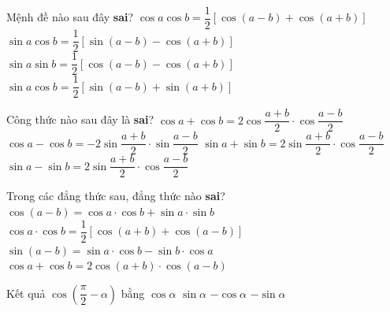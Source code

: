 

\begin{ex}%
	Mệnh đề nào  sau đây \textbf{sai}?
	 \choice
		{$\cos a\cos b=\dfrac  {1}{2}\left[\cos (a-b)+\cos (a+b)\right]$}
		{\True $\sin  a\cos b=\dfrac {1}{2}\left[\sin (a-b)-\cos (a+b)\right]$}
		 {$\sin a\sin b=\dfrac {1}{2}\left[\cos (a-b)-\cos (a+b)\right]$}
		{$\sin a\cos b=\dfrac {1}{2}\left[\sin (a-b)+\sin (a+b)\right]$} 
\end{ex}

\begin{ex}%
	Công thức nào sau đây là  \textbf{sai}?
	\choice 
		{$\cos a+\cos b=2\cos  \dfrac {a+b}{2}\cdot \cos \dfrac {a-b}{2}$}
		{$\cos  a-\cos b=-2\sin \dfrac {a+b}{2}\cdot \sin \dfrac {a-b}{2}$}
		{$\sin  a+\sin b=2\sin \dfrac {a+b}{2}\cdot \cos \dfrac {a-b}{2}$}
		{\True $\sin a-\sin b=2\sin \dfrac  {a+b}{2}\cdot \cos \dfrac {a-b}{2}$}
\end{ex}

\begin{ex}%
	Trong các đẳng thức  sau, đẳng thức nào \textbf{sai}?
	\choice 
		 {$\cos(a-b)=\cos a\cdot \cos b+\sin a\cdot \sin b$}
		{$\cos a\cdot \cos  b=\dfrac {1}{2}\left[\cos(a+b)+\cos(a-b)\right]$}
		{$\sin (a-b)=\sin a\cdot \cos b-\sin  b\cdot \cos a$}
		{\True $\cos a+\cos b=2\cos(a+b)\cdot \cos(a-b)$} 
\end{ex}

\begin{ex}%
	Kết quả  $\cos \left( \dfrac{\pi}{2}-\alpha \right)$ bằng
	 \choice
		 {$\cos \alpha$}
		{\True $\sin  \alpha$}
		{$-\cos  \alpha$}
		 {$-\sin \alpha$}
\end{ex}

